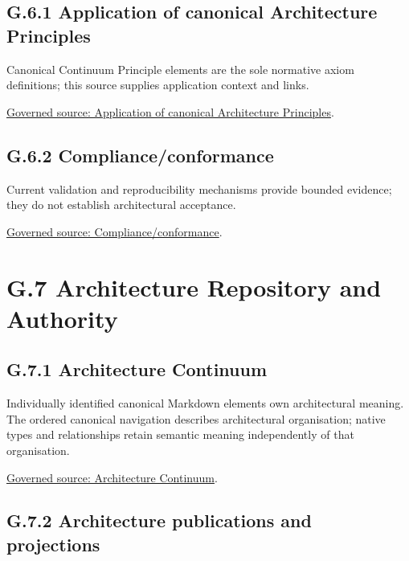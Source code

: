 \subsection*{G.6.1 Application of canonical Architecture Principles}
\label{navigation:G.6.1}

Canonical Continuum Principle elements are the sole normative axiom definitions; this source supplies application context and links.\par
\href{../../../../../../../governance/architectural-axioms.md}{Governed source: Application of canonical Architecture Principles}.\par
\subsection*{G.6.2 Compliance/conformance}
\label{navigation:G.6.2}

Current validation and reproducibility mechanisms provide bounded evidence; they do not establish architectural acceptance.\par
\href{../../../../../../../tooling/README.md}{Governed source: Compliance/conformance}.\par
\section*{G.7 Architecture Repository and Authority}
\label{navigation:G.7}

\subsection*{G.7.1 Architecture Continuum}
\label{navigation:G.7.1}

Individually identified canonical Markdown elements own architectural meaning. The ordered canonical navigation describes architectural organisation; native types and relationships retain semantic meaning independently of that organisation.\par
\href{../../../../../../../governance/continuum-representation.md}{Governed source: Architecture Continuum}.\par
\subsection*{G.7.2 Architecture publications and projections}
\label{navigation:G.7.2}

